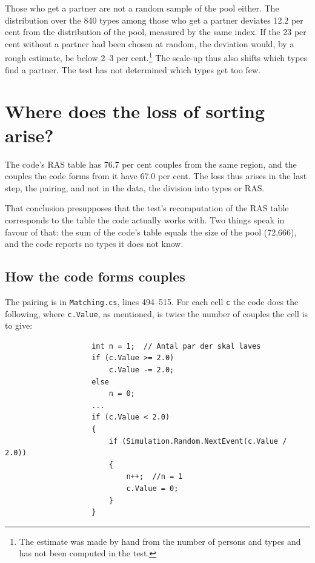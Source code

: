 \documentclass[12pt,a4paper]{article}
\newcommand{\kode}[1]{\texttt{#1}}
\begin{document}
Those who get a partner are not a random sample of the pool either. The distribution over the 840
types among those who get a partner deviates 12.2 per cent from the distribution of the pool,
measured by the same index. If the 23 per cent without a partner had been chosen at random, the
deviation would, by a rough estimate, be below 2--3 per cent.\footnote{The estimate was made by
hand from the number of persons and types and has not been computed in the test.} The scale-up thus
also shifts which types find a partner. The test has not determined which types get too few.


\section{Where does the loss of sorting arise?}\label{sec:fortolkning}

The code's RAS table has 76.7 per cent couples from the same region, and the couples the code forms
from it have 67.0 per cent. The loss thus arises in the last step, the pairing, and not in the
data, the division into types or RAS.

That conclusion presupposes that the test's recomputation of the RAS table corresponds to the table
the code actually works with. Two things speak in favour of that: the sum of the code's table
equals the size of the pool (72,666), and the code reports no types it does not know.

\subsection{How the code forms couples}

The pairing is in \kode{Matching.cs}, lines 494--515. For each cell \kode{c} the code does the
following, where \kode{c.Value}, as mentioned, is twice the number of couples the cell is to give:

{\small
\begin{verbatim}
                    int n = 1;  // Antal par der skal laves
                    if (c.Value >= 2.0)
                        c.Value -= 2.0;
                    else
                        n = 0;
                    ...
                    if (c.Value < 2.0)
                    {
                        if (Simulation.Random.NextEvent(c.Value / 2.0))
                        {
                            n++;  //n = 1
                            c.Value = 0;
                        }
                    }
\end{verbatim}
}
\end{document}
